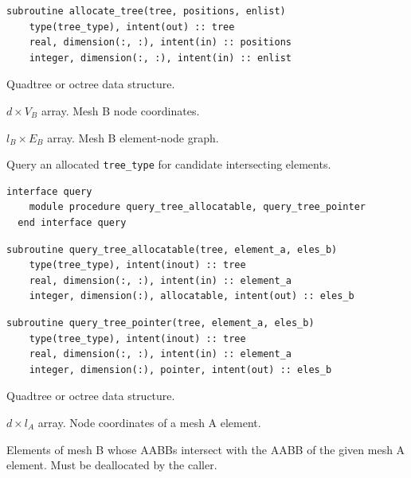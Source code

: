 \documentclass{article}
\begin{document}
\begin{lstlisting}[language=FORTRAN]
  subroutine allocate_tree(tree, positions, enlist)
    type(tree_type), intent(out) :: tree
    real, dimension(:, :), intent(in) :: positions
    integer, dimension(:, :), intent(in) :: enlist
\end{lstlisting}

\begin{description}[font=\ttfamily\bfseries,leftmargin=2.2\parindent,labelindent=1.7\parindent,noitemsep]
  \item[tree] Quadtree or octree data structure.
  \item[positions] $d \times V_B$ array. Mesh B node coordinates.
  \item[enlist] $l_B \times E_B$ array. Mesh B element-node graph.
\end{description}

\noindent Query an allocated \verb+tree_type+ for candidate intersecting
elements.
  
\begin{lstlisting}[language=FORTRAN]
  interface query
    module procedure query_tree_allocatable, query_tree_pointer
  end interface query
\end{lstlisting}
    
\begin{lstlisting}[language=FORTRAN]  
  subroutine query_tree_allocatable(tree, element_a, eles_b)
    type(tree_type), intent(inout) :: tree
    real, dimension(:, :), intent(in) :: element_a
    integer, dimension(:), allocatable, intent(out) :: eles_b
\end{lstlisting}
  
\begin{lstlisting}[language=FORTRAN]  
  subroutine query_tree_pointer(tree, element_a, eles_b)
    type(tree_type), intent(inout) :: tree
    real, dimension(:, :), intent(in) :: element_a
    integer, dimension(:), pointer, intent(out) :: eles_b
\end{lstlisting}

\begin{description}[font=\ttfamily\bfseries,leftmargin=2.2\parindent,labelindent=1.7\parindent,noitemsep]
  \item[tree] Quadtree or octree data structure.
  \item[element\_a] $d \times l_A$ array. Node coordinates of a mesh A element.
  \item[eles\_b] Elements of mesh B whose AABBs intersect with the AABB of the
    given mesh A element. Must be deallocated by the caller.
\end{description}
\end{document}
